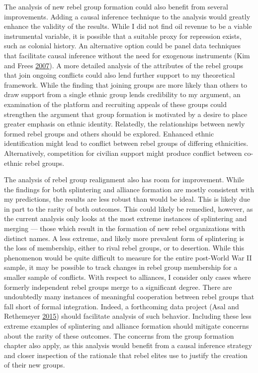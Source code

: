 \documentclass[12pt,]{book}
\theoremstyle{definition}
\theoremstyle{definition}
\theoremstyle{definition}
\theoremstyle{remark}
\begin{document}
The analysis of new rebel group formation could also benefit from
several improvements. Adding a causal inference technique to the
analysis would greatly enhance the validity of the results. While I did
not find oil revenue to be a viable instrumental variable, it is
possible that a suitable proxy for repression exists, such as colonial
history. An alternative option could be panel data techniques that
facilitate causal inference without the need for exogenous instruments
(Kim and Frees \protect\hyperlink{ref-Kim2007}{2007}). A more detailed
analysis of the attributes of the rebel groups that join ongoing
conflicts could also lend further support to my theoretical framework.
While the finding that joining groups are more likely than others to
draw support from a single ethnic group lends credibility to my
argument, an examination of the platform and recruiting appeals of these
groups could strengthen the argument that group formation is motivated
by a desire to place greater emphasis on ethnic identity. Relatedly, the
relationships between newly formed rebel groups and others should be
explored. Enhanced ethnic identification might lead to conflict between
rebel groups of differing ethnicities. Alternatively, competition for
civilian support might produce conflict between co-ethnic rebel groups.

The analysis of rebel group realignment also has room for improvement.
While the findings for both splintering and alliance formation are
mostly consistent with my predictions, the results are less robust than
would be ideal. This is likely due in part to the rarity of both
outcomes. This could likely be remedied, however, as the current
analysis only looks at the most extreme instances of splintering and
merging --- those which result in the formation of new rebel
organizations with distinct names. A less extreme, and likely more
prevalent form of splintering is the loss of membership, either to rival
rebel groups, or to desertion. While this phenomenon would be quite
difficult to measure for the entire post-World War II sample, it may be
possible to track changes in rebel group membership for a smaller sample
of conflicts. With respect to alliances, I consider only cases where
formerly independent rebel groups merge to a significant degree. There
are undoubtedly many instances of meaningful cooperation between rebel
groups that fall short of formal integration. Indeed, a forthcoming data
project (Asal and Rethemeyer \protect\hyperlink{ref-Asal2015}{2015})
should facilitate analysis of such behavior. Including these less
extreme examples of splintering and alliance formation should mitigate
concerns about the rarity of these outcomes. The concerns from the group
formation chapter also apply, as this analysis would benefit from a
causal inference strategy and closer inspection of the rationale that
rebel elites use to justify the creation of their new groups.
\end{document}

